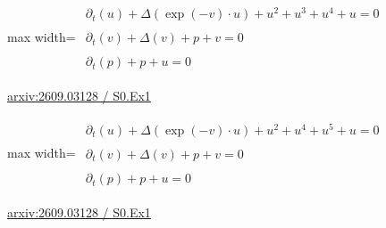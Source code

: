\documentclass[10pt,a4paper]{article}
\begin{document}
\begin{minipage}{\linewidth}
\begin{center}\begin{adjustbox}{max width=\linewidth}$\displaystyle\begin{gathered}\begin{gathered}\partial_{t}(u)+\Delta(\exp(-v)\cdot u)+u^{2}+u^{3}+u^{4}+u=0\end{gathered}\\[5pt]\begin{gathered}\partial_{t}(v)+\Delta(v)+p+v=0\end{gathered}\\[5pt]\begin{gathered}\partial_{t}(p)+p+u=0\end{gathered}\end{gathered}$\end{adjustbox}\end{center}
{\small \href{https://arxiv.org/html/2609.03128#S0.Ex1}{arxiv:2609.03128 / S0.Ex1}}\par
\end{minipage}\par\vspace{7mm}

\begin{minipage}{\linewidth}
\begin{center}\begin{adjustbox}{max width=\linewidth}$\displaystyle\begin{gathered}\begin{gathered}\partial_{t}(u)+\Delta(\exp(-v)\cdot u)+u^{2}+u^{4}+u^{5}+u=0\end{gathered}\\[5pt]\begin{gathered}\partial_{t}(v)+\Delta(v)+p+v=0\end{gathered}\\[5pt]\begin{gathered}\partial_{t}(p)+p+u=0\end{gathered}\end{gathered}$\end{adjustbox}\end{center}
{\small \href{https://arxiv.org/html/2609.03128#S0.Ex1}{arxiv:2609.03128 / S0.Ex1}}\par
\end{minipage}\par\vspace{7mm}
\end{document}

